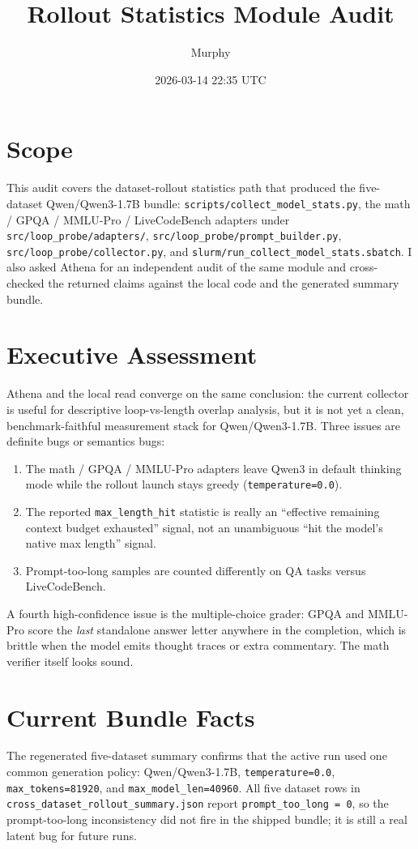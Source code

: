 \documentclass[11pt]{article}
\title{Rollout Statistics Module Audit}
\author{Murphy}
\date{2026-03-14 22:35 UTC}
\begin{document}
\maketitle
\sloppy

\section*{Scope}
This audit covers the dataset-rollout statistics path that produced the five-dataset
Qwen/Qwen3-1.7B bundle: \texttt{scripts/collect\_model\_stats.py}, the math / GPQA /
MMLU-Pro / LiveCodeBench adapters under \texttt{src/loop\_probe/adapters/},
\texttt{src/loop\_probe/prompt\_builder.py}, \texttt{src/loop\_probe/collector.py},
and \texttt{slurm/run\_collect\_model\_stats.sbatch}. I also asked Athena for an
independent audit of the same module and cross-checked the returned claims against the
local code and the generated summary bundle.

\section*{Executive Assessment}
Athena and the local read converge on the same conclusion: the current collector is
useful for descriptive loop-vs-length overlap analysis, but it is not yet a clean,
benchmark-faithful measurement stack for Qwen/Qwen3-1.7B. Three issues are definite
bugs or semantics bugs:

\begin{enumerate}
\item The math / GPQA / MMLU-Pro adapters leave Qwen3 in default thinking mode while
the rollout launch stays greedy (\texttt{temperature=0.0}).
\item The reported \texttt{max\_length\_hit} statistic is really an
``effective remaining context budget exhausted'' signal, not an unambiguous
``hit the model's native max length'' signal.
\item Prompt-too-long samples are counted differently on QA tasks versus
LiveCodeBench.
\end{enumerate}

A fourth high-confidence issue is the multiple-choice grader: GPQA and MMLU-Pro score
the \emph{last} standalone answer letter anywhere in the completion, which is brittle
when the model emits thought traces or extra commentary. The math verifier itself
looks sound.

\section*{Current Bundle Facts}
The regenerated five-dataset summary confirms that the active run used one common
generation policy: Qwen/Qwen3-1.7B, \texttt{temperature=0.0},
\texttt{max\_tokens=81920}, and \texttt{max\_model\_len=40960}. All five dataset rows
in \texttt{cross\_dataset\_rollout\_summary.json} report
\texttt{prompt\_too\_long = 0}, so the prompt-too-long inconsistency did not fire in
the shipped bundle; it is still a real latent bug for future runs.
\end{document}
